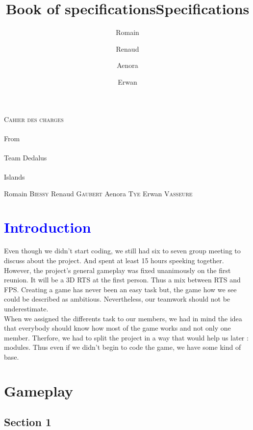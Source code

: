 \documentclass[article]{report} %
\title {Book of specifications}
\title {Specifications}
\author {Romain\and Renaud\and Aenora\and Erwan}
\date {}
\begin{document}
		\thispagestyle{empty}
  			\begin{titlepage} 
						\vspace*{5cm} 
  					\begin{center} 
  							{\huge{\textsc{Cahier des charges} \\ ~ \\{\large From}\\ ~\\ Team Dedalus \\ ~ \\ Islands}}
	  						\vspace*{10cm}
						\end{center}
  					\hfill {\large Romain \textsc{Biessy}}
  					\hfill {\large Renaud \textsc{Gaubert}}
  					\hfill {\large Aenora \textsc{Tye}}
  					\hfill {\large Erwan  \textsc{Vasseure}}
  			\end{titlepage} 
  	\renewcommand{\contentsname}{Table of contents}

  	\tableofcontents
  			\newpage
				\chapter{\textcolor{blue}{Introduction}}%
								Even though we didn't start coding, we still had six to seven group meeting to discuss about the project. And spent at least 15 hours speeking together.\newline
								However, the project's general gameplay was fixed unanimously on the first reunion. It will be a 3D RTS at the first person. Thus a mix between RTS and FPS. Creating a game has never been an easy task but, the game how we see could be described as ambitious. Nevertheless, our teamwork should not be underestimate.\\
								
								When we assigned the differents task to our members, we had in mind the idea that everybody should know how most of the game works and not only one member. Therfore, we had to split the project in a way that would help us later : modules. Thus even if we didn't begin to code the game, we have some kind of base. 								
								
  			\chapter{Gameplay}
						\section{Section 1}
\end{document}
